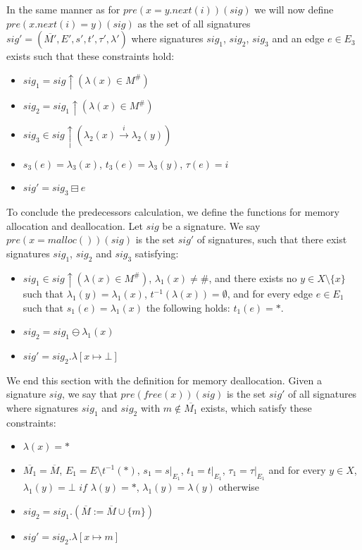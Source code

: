 \noindent
In the same manner as for  $pre(x = y.next(i))(sig)$ we will now define\\
$pre(x.next(i) = y)(sig)$ as the set of all signatures
$sig' = (\overline{M'}, E', s', t', \tau', \lambda')$ where signatures $sig_1$, $sig_2$, $sig_3$ and an edge $e \in E_3$ exists
such that these constraints hold:

\newpage

\begin{itemize}
	\item $sig_1 = sig\uparrow(\lambda(x) \in M^{\#})$
	\item $sig_2 = sig_1\uparrow(\lambda(x) \in M^{\#})$
	\item $sig_3 \in sig\uparrow(\lambda_2(x) \xrightarrow{i} \lambda_2(y))$
	\item $s_3(e) = \lambda_3(x)$, $t_3(e) = \lambda_3(y)$, $\tau(e) = i$
	\item $sig' = sig_3 \boxminus e$
\end{itemize}

\noindent
To conclude the predecessors calculation, we define the functions for memory allocation and deallocation.
Let $sig$ be a signature. We say $pre(x = malloc())(sig)$ is the set $sig'$ of signatures, such that there exist signatures
$sig_1$, $sig_2$ and $sig_3$ satisfying:

\begin{itemize}
	\item $sig_1 \in sig\uparrow(\lambda(x) \in M^{\#})$, $\lambda_1(x) \not= \#$, and there exists no $y \in X \setminus \{x\}$
	such that $\lambda_1(y) = \lambda_1(x)$, $t^{-1}(\lambda(x)) = \emptyset$, and for every edge $e \in E_1$ such that
	$s_1(e) = \lambda_1(x)$ the following holds: $t_1(e) = *$.
	\item $sig_2 = sig_1 \ominus \lambda_1(x)$
	\item $sig' = sig_2.\lambda[x \mapsto \bot]$
\end{itemize}

\noindent
We end this section with the definition for memory deallocation.
Given a signature $sig$, we say that $pre(free(x))(sig)$ is the set $sig'$ of all signatures where signatures $sig_1$ and $sig_2$
with $m \not\in \overline{M_1}$ exists, which satisfy these constraints:

\begin{itemize}
	\item $\lambda(x) = *$
	\item $\overline{M_1} = \overline{M}$, $E_1 = E \setminus t^{-1}(*)$, $s_1 = s|_{E_1}$, $t_1 = t|_{E_1}$, $\tau_1 = \tau|_{E_1}$
	and for every $y \in X$, $\lambda_1(y) = \bot$ $if$ $\lambda(y) = *$, $\lambda_1(y) = \lambda(y)$ otherwise
	\item $sig_2 = sig_1.(\overline{M} := \overline{M} \cup \{m\})$
	\item $sig' = sig_2.\lambda[x \mapsto m]$
\end{itemize}

